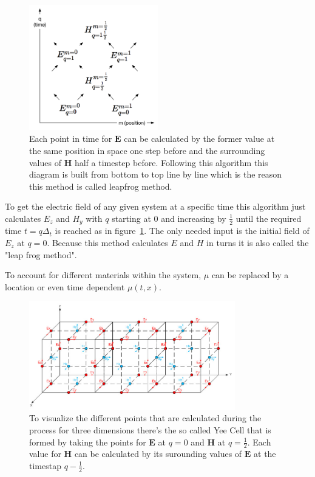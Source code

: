 \begin{figure}[!h]
  \centering
  \includegraphics[width=0.5\textwidth]{./images/space-time-cell.png}
  \caption{Each point in time for $\mathbf{E}$ can be calculated by the former value at the same position in space one step before and the surrounding values of $\mathbf{H}$ half a timestep before. Following this algorithm this diagram is built from bottom to top line by line which is the reason this method is called leapfrog method.}
  \label{fig:leapfrog}
\end{figure}

To get the electric field of any given system at a specific time this algorithm just calculates $E_z$ and $H_y$ with $q$ starting at 0 and increasing by $\frac{1}{2}$ until the required time $t = q\Delta_t$ is reached as in figure~\ref{fig:leapfrog}. The only needed input is the initial field of $E_z$ at $q = 0$. Because this method calculates $E$ and $H$ in turns it is also called the "leap frog method".

To account for different materials within the system, $\mu$ can be replaced by a location or even time dependent $\mu(t, x)$.

\begin{figure}[!h]
  \centering
  \includegraphics[width=0.8\textwidth]{./images/yeecell.jpg}
  \caption{To visualize the different points that are calculated during the process for three dimensions there's the so called Yee Cell that is formed by taking the points for $\mathbf{E}$ at $q=0$ and $\mathbf{H}$ at $q=\frac{1}{2}$. Each value for $\mathbf{H}$ can be calculated by its surounding values of $\mathbf{E}$ at the timestap $q-\frac{1}{2}$. \mcite}
\end{figure}
